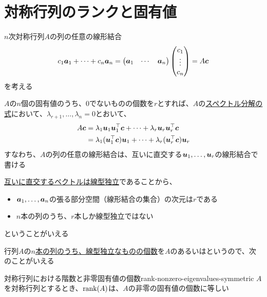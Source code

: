 \documentclass[../../../topic_linear-algebra]{subfiles}
\begin{document}
\sectionline
\section{対称行列のランクと固有値}

$n$次対称行列$A$の列の任意の線形結合
\begin{equation*}
  c_1\vb*{a}_1 + \cdots + c_n\vb*{a}_n = \begin{pmatrix}
    \vb*{a}_1 & \cdots & \vb*{a}_n
  \end{pmatrix} \begin{pmatrix}
    c_1    \\
    \vdots \\
    c_n
  \end{pmatrix} = A\vb*{c}
\end{equation*}
を考える

\br

$A$の$n$個の固有値のうち、0でないものの個数を$r$とすれば、$A$の\hyperref[thm:spectral-decomposition-symmetric]{スペクトル分解の式}において、$\lambda_{r+1}, \ldots, \lambda_n = 0$とおいて、
\begin{align*}
  A\vb*{c} & = \lambda_1\vb*{u}_1\vb*{u}_1^\top\vb*{c} + \cdots + \lambda_r\vb*{u}_r\vb*{u}_r^\top\vb*{c}     \\
           & = \lambda_1(\vb*{u}_1^\top\vb*{c})\vb*{u}_1 + \cdots + \lambda_r(\vb*{u}_r^\top\vb*{c})\vb*{u}_r
\end{align*}
すなわち、$A$の列の任意の線形結合は、互いに直交する$\vb*{u}_1, \ldots, \vb*{u}_r$の線形結合で書ける

\br

\hyperref[thm:orthogonal-set-is-independent]{互いに直交するベクトルは線型独立}であることから、
\begin{itemize}
  \item $\vb*{a}_1, \ldots, \vb*{a}_n$の張る部分空間（線形結合の集合）の次元は$r$である
  \item $n$本の列のうち、$r$本しか線型独立ではない
\end{itemize}
ということがいえる

\br

行列$A$の\hyperref[thm:rank-equals-max-indep-cols]{$n$本の列のうち、線型独立なものの個数}を$A$のあるいはというので、次のことがいえる

\begin{theorem}{対称行列における階数と非零固有値の個数}{rank-nonzero-eigenvalues-symmetric}
  $A$を対称行列とするとき、$\rank(A)$は、$A$の非零の固有値の個数に等しい
\end{theorem}
\end{document}
